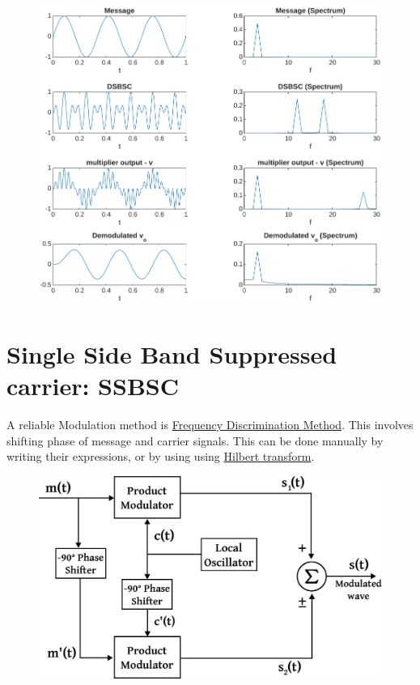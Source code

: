 \begin{figure}[H]
	\centering
	\includegraphics[width=\textwidth]{img/dsbsc.pdf}
\end{figure}

\section{Single Side Band Suppressed carrier: SSBSC}

A reliable Modulation method is  \underline{Frequency Discrimination Method}. This involves shifting phase of message and carrier signals. This can be done manually by writing their expressions, or by using using \href{https://en.wikipedia.org/wiki/Hilbert_transform}{Hilbert transform}.

\begin{figure}[H]
	\centering
	\includegraphics[width=.7\textwidth]{img/freq_disc.pdf}
\end{figure}

